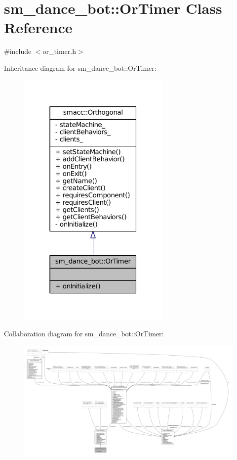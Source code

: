 \hypertarget{classsm__dance__bot_1_1OrTimer}{}\section{sm\+\_\+dance\+\_\+bot\+:\+:Or\+Timer Class Reference}
\label{classsm__dance__bot_1_1OrTimer}


{\ttfamily \#include $<$or\+\_\+timer.\+h$>$}



Inheritance diagram for sm\+\_\+dance\+\_\+bot\+:\+:Or\+Timer\+:
\nopagebreak
\begin{figure}[H]
\begin{center}
\leavevmode
\includegraphics[width=211pt]{classsm__dance__bot_1_1OrTimer__inherit__graph}
\end{center}
\end{figure}


Collaboration diagram for sm\+\_\+dance\+\_\+bot\+:\+:Or\+Timer\+:
\nopagebreak
\begin{figure}[H]
\begin{center}
\leavevmode
\includegraphics[width=350pt]{classsm__dance__bot_1_1OrTimer__coll__graph}
\end{center}
\end{figure}
